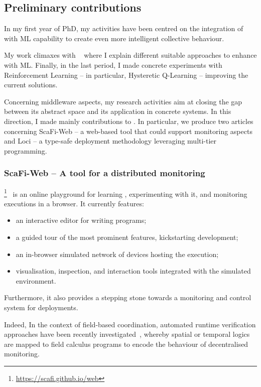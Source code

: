 \documentclass[11pt]{article}
\begin{document}
\subsection{Preliminary contributions}
In my first year of PhD, my activities have been centred on
the integration of \ac{} with ML capability to create even more
intelligent collective behaviour. 

My work climaxes with ~\cite{research} where I explain different suitable approaches to
enhance \ac{} with ML. Finally, in the last period, I made concrete
experiments with Reinforcement Learning -- in particular, Hysteretic Q-Learning \cite{hysteretic-q} -- improving the current \ac{} solutions.

Concerning middleware aspects, my research activities aim at closing the gap between
its abstract space and its application in concrete systems. In this direction, I made mainly contributions to \scafi. In particular, we produce two articles concerning ScaFi-Web -- a web-based tool that could support monitoring aspects and \scafi Loci -- a type-safe deployment methodology leveraging multi-tier programming.
\subsubsection{ScaFi-Web -- A tool for a distributed monitoring}
\scafiweb{}\footnote{\url{https://scafi.github.io/web}}~\cite{DBLP:conf/coordination/AguzziCMPV21}
 is an online playground for learning \ac{}, experimenting with it, and monitoring executions in a browser.
It currently features:
\begin{itemize}
 \item an interactive editor for writing \scafi{} programs;
 \item a guided tour of the most prominent features, kickstarting development;
 \item an in-browser simulated network of devices hosting the execution;
 \item visualisation, inspection, and interaction tools integrated with the simulated environment.
\end{itemize}

Furthermore, it also provides a stepping stone towards a monitoring and control system for \ac{} deployments.

Indeed, In the context of field-based coordination, automated runtime verification approaches have been recently investigated~\cite{DBLP:journals/jss/AudritoCDSV21}, whereby spatial or temporal logics are mapped to field calculus programs to encode the behaviour of decentralised monitoring.
\end{document}
